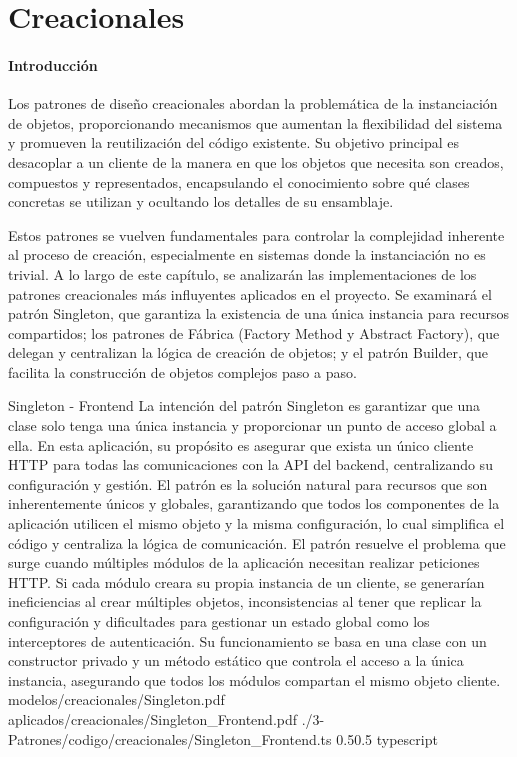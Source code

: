 \graphicspath{{./3-Patrones/imgs/}}

\chapter{Creacionales}
\subsubsection{Introducción}{
    Los patrones de diseño creacionales abordan la problemática de la instanciación de objetos, proporcionando mecanismos que aumentan la flexibilidad del sistema y promueven la reutilización del código existente. Su objetivo principal es desacoplar a un cliente de la manera en que los objetos que necesita son creados, compuestos y representados, encapsulando el conocimiento sobre qué clases concretas se utilizan y ocultando los detalles de su ensamblaje.

    Estos patrones se vuelven fundamentales para controlar la complejidad inherente al proceso de creación, especialmente en sistemas donde la instanciación no es trivial. A lo largo de este capítulo, se analizarán las implementaciones de los patrones creacionales más influyentes aplicados en el proyecto. Se examinará el patrón Singleton, que garantiza la existencia de una única instancia para recursos compartidos; los patrones de Fábrica (Factory Method y Abstract Factory), que delegan y centralizan la lógica de creación de objetos; y el patrón Builder, que facilita la construcción de objetos complejos paso a paso.
}

\Patron
    {Singleton - Frontend}
    {La intención del patrón Singleton es garantizar que una clase solo tenga una única instancia y proporcionar un punto de acceso global a ella. En esta aplicación, su propósito es asegurar que exista un único cliente HTTP para todas las comunicaciones con la API del backend, centralizando su configuración y gestión. El patrón es la solución natural para recursos que son inherentemente únicos y globales, garantizando que todos los componentes de la aplicación utilicen el mismo objeto y la misma configuración, lo cual simplifica el código y centraliza la lógica de comunicación.}
    {El patrón resuelve el problema que surge cuando múltiples módulos de la aplicación necesitan realizar peticiones HTTP. Si cada módulo creara su propia instancia de un cliente, se generarían ineficiencias al crear múltiples objetos, inconsistencias al tener que replicar la configuración y dificultades para gestionar un estado global como los interceptores de autenticación. Su funcionamiento se basa en una clase con un constructor privado y un método estático que controla el acceso a la única instancia, asegurando que todos los módulos compartan el mismo objeto cliente.}
    {modelos/creacionales/Singleton.pdf}
    {aplicados/creacionales/Singleton_Frontend.pdf}
    {./3-Patrones/codigo/creacionales/Singleton_Frontend.ts}
    {0.5}{0.5}
    {typescript}
\newpage

